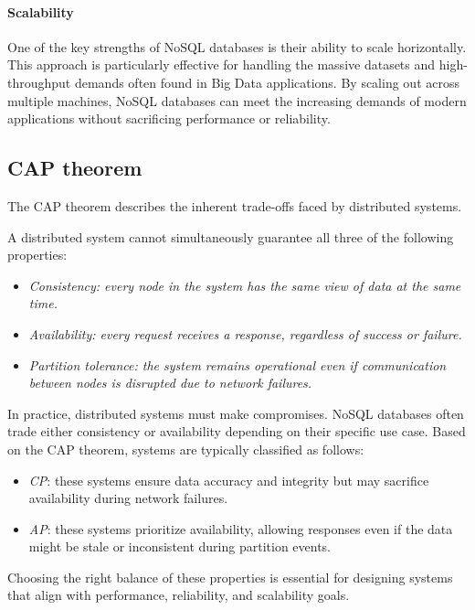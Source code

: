 \paragraph*{Scalability}
One of the key strengths of NoSQL databases is their ability to scale horizontally. 
This approach is particularly effective for handling the massive datasets and high-throughput demands often found in Big Data applications. 
By scaling out across multiple machines, NoSQL databases can meet the increasing demands of modern applications without sacrificing performance or reliability.

\subsection{CAP theorem}
The CAP theorem describes the inherent trade-offs faced by distributed systems.
\begin{theorem}
    A distributed system cannot simultaneously guarantee all three of the following properties:
\end{theorem}
\begin{itemize}
    \item \textit{Consistency: every node in the system has the same view of data at the same time.}
    \item \textit{Availability: every request receives a response, regardless of success or failure.}
    \item \textit{Partition tolerance: the system remains operational even if communication between nodes is disrupted due to network failures.}
\end{itemize}
In practice, distributed systems must make compromises. 
NoSQL databases often trade either consistency or availability depending on their specific use case. 
Based on the CAP theorem, systems are typically classified as follows:
\begin{itemize}
    \item \textit{CP}: these systems ensure data accuracy and integrity but may sacrifice availability during network failures.
    \item \textit{AP}: these systems prioritize availability, allowing responses even if the data might be stale or inconsistent during partition events.
\end{itemize}
Choosing the right balance of these properties is essential for designing systems that align with performance, reliability, and scalability goals.


